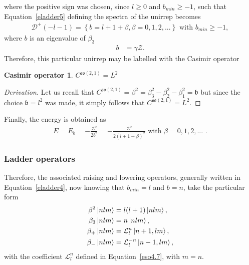 \documentclass[12pt,a4paper]{report}
\theoremstyle{definition}
\newtheorem*{casimir}{Casimir operator}
\newenvironment{derivation}
  {\renewcommand\qedsymbol{$\square$}\begin{proof}[Derivation]}
  {\end{proof}}
\theoremstyle{remark}
\theoremstyle{remark}
\begin{document}
where the positive sign was chosen, since $l\geq 0$ and $b_{min}\geq -1$, such that Equation~\ref{eladder5} defining the spectra of the unirrep becomes
\begin{align*}
\mathcal{D}^+(-l-1)=\left\lbrace b=l+1+\beta,\beta=0,1,2,...\right\rbrace \text{ with }b_{min}\geq -1,
\end{align*}
where $b$ is an eigenvalue of $\beta_3$
\begin{align*}
b&=\gamma\mathcal{Z}.
\end{align*}
Therefore, this particular unirrep may be labelled with the Casimir operator
\begin{casimir}\label{casimirso21} $C^{\mathfrak{so}(2,1)}=L^2$
\end{casimir}
\begin{derivation}
Let us recall that $C^{\mathfrak{so}(2,1)}=\beta^2=\beta_3^2-\beta_2^2-\beta_1^2=\mathfrak{b}$ but since the choice $\mathfrak{b}=l^2$ was made, it simply follows that $C^{\mathfrak{so}(2,1)}=L^2$.
\end{derivation}
Finally, the energy is obtained as
\begin{align*}
E=E_{b}=-\frac{\mathcal{Z}^2}{2b^2}=-\frac{\mathcal{Z}^2}{2(l+1+\beta)^2} \text{ with } \beta=0,1,2,...\text{ .}
\end{align*}

\subsubsection{Ladder operators}
Therefore, the associated raising and lowering operators, generally written in Equation~\ref{eladder4}, now knowing that $b_{min}=l$ and $b=n$, take the particular form
\begin{equation}\label{eso21.3}
\begin{aligned}
\beta^2\ket{nlm}&=l(l+1)\ket{nlm},\\
\beta_3\ket{nlm}&=n\ket{nlm},\\
\beta_+\ket{nlm}&=\mathcal{L}_l^n\ket{n+1,lm},\\
\beta_-\ket{nlm}&=\mathcal{L}_l^{-n}\ket{n-1,lm},
\end{aligned}
\end{equation}
with the coefficient $\mathcal{L}_l^n$ defined in Equation~\ref{eso4.7}, with $m=n$.
\end{document}

